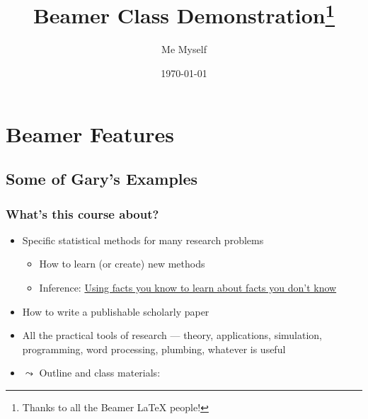 \documentclass[11pt]{beamer}
\title[Beamer Demo]{Beamer Class Demonstration\thanks{Thanks to all the Beamer LaTeX people!}}
\author{Me Myself}
\date{\today}
\institute{IQSS}
\begin{document}
\frame[plain]{\titlepage}

\section[Features]{Beamer Features}

\subsection{Some of Gary's Examples}
\begin{frame}\frametitle{What's this course about?}

  \begin{itemize}
  \item \alert{Specific statistical methods for many research problems}
    \begin{itemize}
    \item How to learn (or create) new methods
    \item Inference: \underline{Using facts you know to learn about
        facts you don't know}
    \end{itemize}
  \item \alert{How to write a publishable scholarly paper}
  \item \alert{All the practical tools of research} --- theory,
    applications, simulation, programming, word processing, plumbing,
    whatever is useful
  \item $\leadsto$ \alert{Outline and class materials:}
  \end{itemize}
\end{frame}
\end{document}
